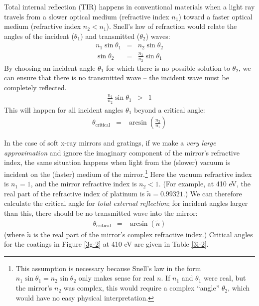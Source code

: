 Total internal reflection (TIR) happens in conventional materials when a light ray travels from a slower optical medium (refractive index $n_1$) toward a faster optical medium (refractive index $n_2 < n_1$).  Snell's law of refraction would relate the angles of the incident ($\theta_1$) and transmitted ($\theta_2$) waves:
\begin{eqnarray}
n_1 \sin \theta_1 &=& n_2 \sin \theta_2 \\
\sin \theta_2 &=& \frac{n_1}{n_2} \sin \theta_1
\end{eqnarray}
By choosing an incident angle $\theta_1$ for which there is no possible solution to $\theta_2$, we can ensure that there is no transmitted wave -- the incident wave must be completely reflected.
\begin{eqnarray}
 \frac{n_1}{n_2} \sin \theta_1 &>& 1
\end{eqnarray}
This will happen for all incident angles $\theta_1$ beyond a critical angle:
\begin{eqnarray}
\theta_{\mathrm{critical}} &=& \arcsin \left( \frac{n_2}{n_1} \right)
\end{eqnarray}

In the case of soft x-ray mirrors and gratings, if we make a \emph{very large approximation} and ignore the imaginary component of the mirror's refractive index, the same situation happens when light from the (slower) vacuum is incident on the (faster) medium of the mirror.\footnote{This assumption is necessary because Snell's law in the form $n_1 \sin \theta_1 = n_2 \sin \theta_2$ only makes sense for real $n$.  If $n_1$ and $\theta_1$ were real, but the mirror's $n_2$ was complex, this would require a complex ``angle'' $\theta_2$, which would have no easy physical interpretation.}  Here the vacuum refractive index is $n_1=1$, and the mirror refractive index is ${n}_2<1$.  (For example, at 410 eV, the real part of the refractive index of platinum is $\tilde{n} = 0.99321$.)  We can therefore calculate the critical angle for \emph{total external reflection}; for incident angles larger than this, there should be no transmitted wave into the mirror:
\begin{eqnarray}
\theta_{\mathrm{critical}} &=& \arcsin \left( \tilde n \right)
\end{eqnarray}
(where $\tilde n$ is the real part of the mirror's complex refractive index.)  Critical angles for the coatings in Figure \ref{3g-2} at 410 eV are given in Table \ref{3i-2}.

